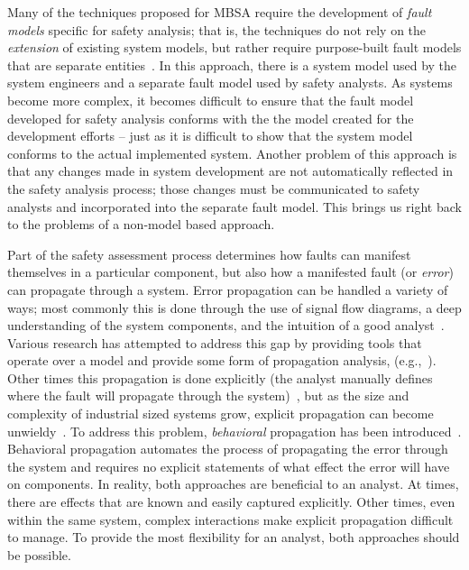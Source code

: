 Many of the techniques proposed for MBSA require the development of {\em fault models} specific for safety analysis; that is, the techniques do not rely on the \emph{extension} of existing system models, but rather require purpose-built fault models that are separate entities~\cite{symbAltaRica, DBLP:conf/tacas/BittnerBCCGGMMZ16, info17:HaLuHo, Gudemann:2010:FQQ:1909626.1909813}. In this approach, there is a system model used by the system engineers and a separate fault model used by safety analysts. %
As systems become more complex, it becomes difficult to ensure that the fault model developed for safety analysis conforms with the the model created for the development efforts -- just as it is difficult to show that the system model conforms to the actual implemented system. Another problem of this approach is that any changes made in system development are not automatically reflected in the safety analysis process; those changes must be communicated to safety analysts and incorporated into the separate fault model. This brings us right back to the problems of a non-model based approach.

Part of the safety assessment process determines how faults can manifest themselves in a particular component, but also how a manifested fault (or \emph{error}) can propagate through a system. Error propagation can be handled a variety of ways; most commonly this is done through the use of signal flow diagrams, a deep understanding of the system components, and the intuition of a good analyst~\cite{lisagor2010failure}. Various research has attempted to address this gap by providing tools that operate over a model and provide some form of propagation analysis, (e.g.,~\cite{EMV2, Joshi05:SafeComp, DBLP:conf/tacas/BittnerBCCGGMMZ16}). Other times this propagation is done explicitly (the analyst manually defines where the fault will propagate through the system)~\cite{lisagor2011model}, but as the size and complexity of industrial sized systems grow, explicit propagation can become unwieldy~\cite{Stewart17:IMBSA}. To address this problem, \emph{behavioral} propagation has been introduced~\cite{DBLP:conf/tacas/BittnerBCCGGMMZ16,stewart2020safety}. Behavioral propagation automates the process of propagating the error through the system and requires no explicit statements of what effect the error will have on components. In reality, both approaches are beneficial to an analyst. At times, there are effects that are known and easily captured explicitly. Other times, even within the same system, complex interactions make explicit propagation difficult to manage. To provide the most flexibility for an analyst, both approaches should be possible.

